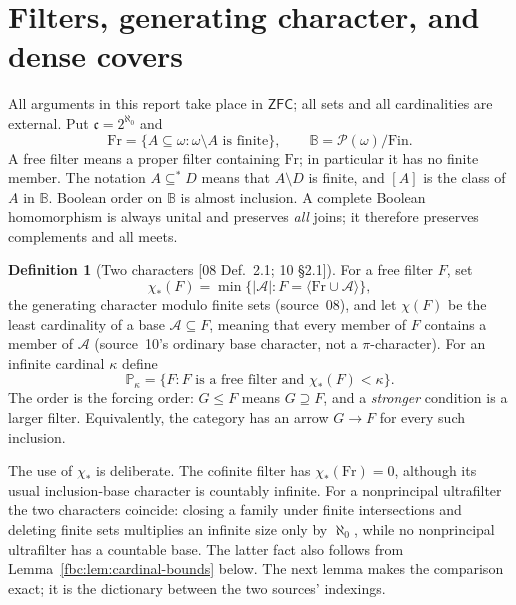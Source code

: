 \documentclass[11pt,letterpaper]{article}
\theoremstyle{definition}
\newtheorem{definition}[theorem]{Definition}
\theoremstyle{remark}
\newcommand{\om}{\omega}
\newcommand{\Fr}{\mathrm{Fr}}
\newcommand{\Fin}{\mathrm{Fin}}
\newcommand{\B}{\mathbb B}
\newcommand{\PP}{\mathbb P}
\newcommand{\pow}{\mathcal P}
\newcommand{\cc}{\mathfrak c}
\newcommand{\gen}[1]{\langle #1\rangle}
\newcommand{\ZFC}{\mathsf{ZFC}}
\newcommand{\src}[1]{\textup{[#1]}}
\begin{document}
\section{Filters, generating character, and dense covers}
\label{fbc:sec:filters}

All arguments in this report take place in $\ZFC$; all sets and all
cardinalities are external. Put $\cc=2^{\aleph_0}$ and
\[
 \Fr=\{A\subseteq\om:\om\setminus A\text{ is finite}\},
 \qquad \B=\pow(\om)/\Fin.
\]
A free filter means a proper filter containing $\Fr$; in particular it
has no finite member. The notation $A\subseteq^*D$ means that
$A\setminus D$ is finite, and $[A]$ is the class of $A$ in $\B$.
Boolean order on $\B$ is almost inclusion. A complete Boolean
homomorphism is always unital and preserves \emph{all} joins; it
therefore preserves complements and all meets.

\begin{definition}[Two characters \src{08 Def.~2.1; 10 \S2.1}]\label{fbc:def:characters}
For a free filter $F$, set
\[
 \chi_*(F)=\min\{|\mathcal A|:
 F=\gen{\Fr\cup\mathcal A}\},
\]
the generating character modulo finite sets (source~08), and let
$\chi(F)$ be the least cardinality of a base $\mathcal A\subseteq F$,
meaning that every member of $F$ contains a member of $\mathcal A$
(source~10's ordinary base character, not a $\pi$-character). For an
infinite cardinal $\kappa$ define
\[
 \PP_\kappa=\{F:F\text{ is a free filter and }\chi_*(F)<\kappa\}.
\]
The order is the forcing order: $G\leq F$ means $G\supseteq F$, and a
\emph{stronger} condition is a larger filter. Equivalently, the category
has an arrow $G\to F$ for every such inclusion.
\end{definition}

The use of $\chi_*$ is deliberate. The cofinite filter has
$\chi_*(\Fr)=0$, although its usual inclusion-base character is
countably infinite. For a nonprincipal ultrafilter the two characters
coincide: closing a family under finite intersections and deleting
finite sets multiplies an infinite size only by $\aleph_0$, while
no nonprincipal ultrafilter has a countable base. The latter fact also
follows from Lemma~\ref{fbc:lem:cardinal-bounds} below. The next lemma
makes the comparison exact; it is the dictionary between the two
sources' indexings.
\end{document}
